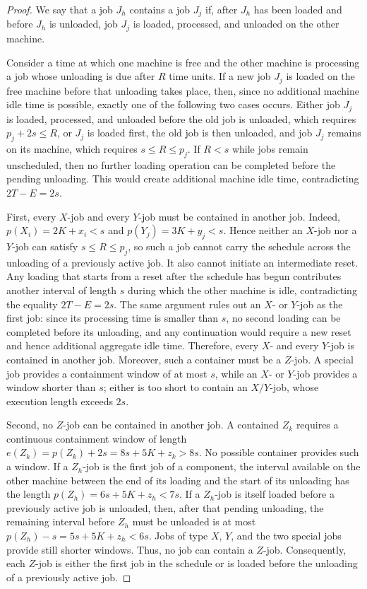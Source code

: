 \documentclass[11pt]{article}
\begin{document}
\begin{proof}
We say that a job \(J_h\) contains a job \(J_j\) if, after \(J_h\) has been loaded and
before \(J_h\) is unloaded, job \(J_j\) is loaded, processed, and unloaded on the other
machine.

Consider a time at which one machine is free and the other machine is processing a job
whose unloading is due after \(R\) time units. If a new job \(J_j\) is loaded on the
free machine before that unloading takes place, then, since no additional machine idle
time is possible, exactly one of the following two cases occurs. Either job \(J_j\) is loaded,
processed, and unloaded before the old job is unloaded, which requires \(p_j+2s\le R\), or \(J_j\) is loaded first, the old job is then unloaded, and job \(J_j\) remains on its machine, which requires \(s\le R\le p_j\).
If \(R<s\) while jobs remain unscheduled, then no further loading operation can be
completed before the pending unloading. This would create additional machine idle
time, contradicting \(2T-E=2s\).

First, every \(X\)-job and every \(Y\)-job must be contained in another job. Indeed, \(p(X_i)=2K+x_i<s\) and \(p(Y_j)=3K+y_j<s\).
Hence neither an \(X\)-job nor a \(Y\)-job can satisfy \(s\le R\le p_j\), so such a
job cannot carry the schedule across the unloading of a previously active job. It
also cannot initiate an intermediate reset. Any loading that starts from a reset
after the schedule has begun contributes another interval of length \(s\) during
which the other machine is idle, contradicting the equality \(2T-E=2s\). The same
argument rules out an \(X\)- or \(Y\)-job as the first job: since its processing
time is smaller than \(s\), no second loading can be completed before its unloading,
and any continuation would require a new reset and hence additional aggregate idle
time. Therefore, every \(X\)- and every \(Y\)-job is contained in another job.
Moreover, such a container must be a \(Z\)-job. A special job provides a containment
window of at most \(s\), while an \(X\)- or \(Y\)-job provides a window shorter than
\(s\); either is too short to contain an \(X/Y\)-job, whose execution length exceeds
\(2s\).

Second, no \(Z\)-job can be contained in another job. A contained \(Z_k\) requires a continuous containment window of length \(e(Z_k)=p(Z_k)+2s=8s+5K+z_k>8s\).
No possible container provides such a window. If a \(Z_h\)-job is the first job of
a component, the interval available on the other machine between the end of its
loading and the start of its unloading has the length \(p(Z_h)=6s+5K+z_h<7s\).
If a \(Z_h\)-job is itself loaded before a previously active job is unloaded, then,
after that pending unloading, the remaining interval before \(Z_h\) must be unloaded is at most \(p(Z_h)-s=5s+5K+z_h<6s\).
Jobs of type \(X\), \(Y\), and the two special jobs provide still shorter windows.
Thus, no job can contain a \(Z\)-job. Consequently, each \(Z\)-job is either the first
job in the schedule or is loaded before the unloading of a previously active job.


\end{proof}
\end{document}
